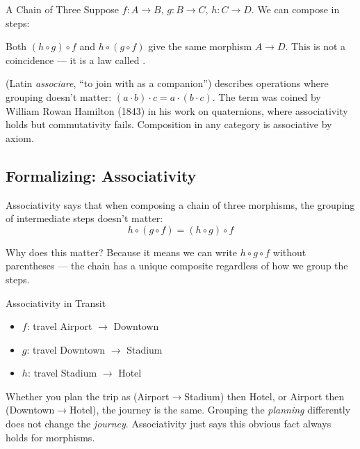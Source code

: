 \begin{example}{A Chain of Three}
Suppose $f : A \to B$, $g : B \to C$, $h : C \to D$. We can compose in steps:

\medskip
\begin{center}
\end{center}
\medskip

Both $(h \circ g) \circ f$ and $h \circ (g \circ f)$ give the same morphism
$A \to D$. This is not a coincidence --- it is a law called .
\end{example}

\begin{nameorigin}
 (Latin \emph{associare}, ``to join with as a
companion'') describes operations where grouping doesn't matter:
$(a \cdot b) \cdot c = a \cdot (b \cdot c)$. The term was coined by
William Rowan Hamilton (1843) in his work on quaternions, where
associativity holds but commutativity fails. Composition in any
category is associative by axiom.
\end{nameorigin}

\subsection{Formalizing: Associativity}

Associativity says that when composing a chain of three morphisms, the
grouping of intermediate steps doesn't matter:
\[
  h \circ (g \circ f) = (h \circ g) \circ f
\]

Why does this matter? Because it means we can write $h \circ g \circ f$
without parentheses --- the chain has a unique composite regardless of how we
group the steps.

\begin{example}{Associativity in Transit}
\begin{itemize}
  \item $f$: travel Airport $\to$ Downtown
  \item $g$: travel Downtown $\to$ Stadium
  \item $h$: travel Stadium $\to$ Hotel
\end{itemize}
Whether you plan the trip as (Airport$\to$Stadium) then Hotel, or Airport then
(Downtown$\to$Hotel), the journey is the same. Grouping the \emph{planning}
differently does not change the \emph{journey}. Associativity just says this
obvious fact always holds for morphisms.
\end{example}

